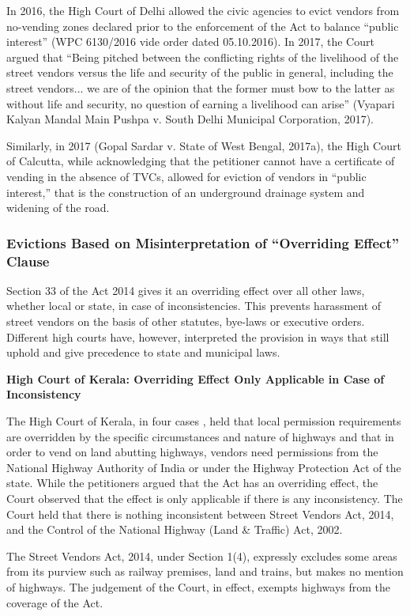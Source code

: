 \documentclass[a4paper, 12pt, twoside]{article}
\begin{document}
{In 2016, the High Court of Delhi allowed the civic agencies to evict vendors from no-vending zones declared prior to the enforcement of the Act to balance “public interest” (WPC 6130/2016 vide order dated 05.10.2016). In 2017, the Court argued that “Being pitched between the conflicting rights of the livelihood of the street vendors versus the life and security of the public in general, including the street vendors... we are of the opinion that the former must bow to the latter as without life and security, no question of earning a livelihood can arise” (Vyapari Kalyan Mandal Main Pushpa v. South Delhi Municipal Corporation, 2017).

Similarly, in 2017 (Gopal Sardar v. State of West Bengal, 2017a), the High Court of Calcutta, while acknowledging that the petitioner cannot have a certificate of vending in the absence of TVCs, allowed for eviction of vendors in “public interest,” that is the construction of an underground drainage system and widening of the road.

\subsubsection*{Evictions Based on Misinterpretation of “Overriding Effect” Clause}

Section 33 of the Act 2014 gives it an overriding effect over all other laws, whether local or state, in case of inconsistencies. This prevents harassment of street vendors on the basis of other statutes, bye-laws or executive orders. Different high courts have, however, interpreted the provision in ways that still uphold and give precedence to state and municipal laws.

\textbf{High Court of Kerala: Overriding Effect Only Applicable in Case of Inconsistency}

The High Court of Kerala, in four cases , held that local permission requirements are overridden by the specific circumstances and nature of highways and that in order to vend on land abutting highways, vendors need permissions from the National Highway Authority of India or under the Highway Protection Act of the state. While the petitioners argued that the Act has an overriding effect, the Court observed that the effect is only applicable if there is any inconsistency. The Court held that there is nothing inconsistent between Street Vendors Act, 2014, and the Control of the National Highway (Land \& Traffic) Act, 2002.

The Street Vendors Act, 2014, under Section 1(4), expressly excludes some areas from its purview such as railway premises, land and trains, but makes no mention of highways. The judgement of the Court, in effect, exempts highways from the coverage of the Act.

}
\end{document}
